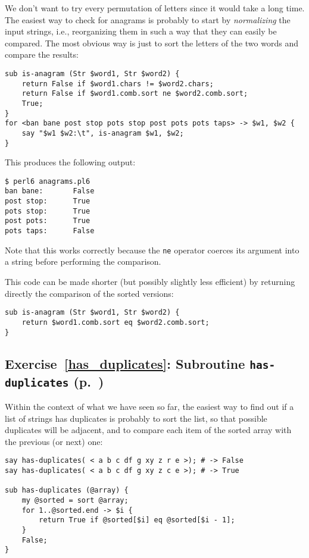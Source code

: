 We don't want to try every permutation of letters 
since it would take a long time. The 
easiest way to check for anagrams is probably to start 
by \emph{normalizing} the input strings, i.e., 
reorganizing them in such a way that they can easily 
be compared. The most obvious way is just to sort the 
letters of the two words and compare the results:

\begin{verbatim}
sub is-anagram (Str $word1, Str $word2) {
    return False if $word1.chars != $word2.chars;
    return False if $word1.comb.sort ne $word2.comb.sort;
    True;
}
for <ban bane post stop pots stop post pots pots taps> -> $w1, $w2 {
    say "$w1 $w2:\t", is-anagram $w1, $w2;
}
\end{verbatim}

This produces the following output:
\begin{verbatim}
$ perl6 anagrams.pl6
ban bane:       False
post stop:      True
pots stop:      True
post pots:      True
pots taps:      False
\end{verbatim}

Note that this works correctly because the {\tt ne} 
operator coerces its argument into a string before 
performing the comparison.

This code can be made shorter (but possibly slightly less 
efficient) by returning directly the comparison of 
the sorted versions:

\begin{verbatim}
sub is-anagram (Str $word1, Str $word2) {
    return $word1.comb.sort eq $word2.comb.sort;
}
\end{verbatim}


\subsection{Exercise~\ref{has_duplicates}: Subroutine {\tt has-duplicates} (p.~\pageref{has_duplicates})}
\label{sol_has_duplicates}

Within the context of what we have seen so far, the 
easiest way to find out if a list of strings has 
duplicates is probably to sort the list, so that 
possible duplicates will be adjacent, and to 
compare each item of the sorted array with the 
previous (or next) one:

\begin{verbatim}
say has-duplicates( < a b c df g xy z r e >); # -> False
say has-duplicates( < a b c df g xy z c e >); # -> True

sub has-duplicates (@array) {
    my @sorted = sort @array;
    for 1..@sorted.end -> $i {
        return True if @sorted[$i] eq @sorted[$i - 1];
    }
    False;
}
\end{verbatim}
%

